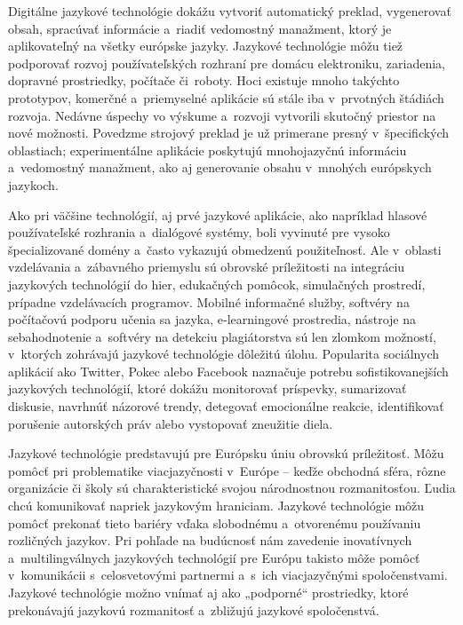 \begin{multicols}{2}
Digitálne jazykové technológie dokážu vytvoriť automatický preklad, vygenerovať obsah, spracúvať informácie a~riadiť vedomostný manažment, ktorý je aplikovateľný na všetky európske jazyky. Jazykové technológie môžu tiež podporovať rozvoj používateľských rozhraní pre domácu elektroniku, zariadenia, dopravné prostriedky, počítače či~roboty. Hoci existuje mnoho takýchto prototypov, komerčné a~priemyselné aplikácie sú stále iba v~prvotných štádiách rozvoja. Nedávne úspechy vo výskume a~rozvoji vytvorili skutočný priestor na nové možnosti. Povedzme strojový preklad je už primerane presný v~špecifických oblastiach; experimentálne aplikácie poskytujú mnohojazyčnú informáciu a~vedomostný manažment, ako aj generovanie obsahu v~mnohých európskych jazykoch.

Ako pri väčšine technológií, aj prvé jazykové aplikácie, ako napríklad hlasové používateľské rozhrania a~dialógové systémy, boli vyvinuté pre vysoko špecializované domény a~často vykazujú obmedzenú použiteľnosť. Ale v~oblasti vzdelávania a~zábavného priemyslu sú obrovské príležitosti na integráciu jazykových technológií do hier, edukačných pomôcok, simulačných prostredí, prípadne vzdelávacích programov. Mobilné informačné služby, softvéry na počítačovú podporu učenia sa jazyka, e‑learningové prostredia, nástroje na sebahodnotenie a~softvéry na detekciu plagiátorstva sú len zlomkom možností, v~ktorých zohrávajú jazykové technológie dôležitú úlohu. Popularita sociálnych aplikácií ako Twitter, Pokec alebo Facebook naznačuje potrebu sofistikovanejších jazykových technológií, ktoré dokážu monitorovať príspevky, sumarizovať diskusie, navrhnúť názorové trendy, detegovať emocionálne reakcie, identifikovať porušenie autorských práv alebo vystopovať zneužitie diela.


Jazykové technológie predstavujú pre Eu\-róp\-sku úniu obrovskú
príležitosť. Môžu pomôcť pri problematike viacjazyčnosti
v~Eu\-ró\-pe – keďže  obchodná sféra, rôzne organizácie či školy
sú charakteristické svojou národnostnou rozmanitosťou. Ľudia chcú
komunikovať napriek jazykovým hraniciam. Jazykové technológie môžu
pomôcť prekonať tieto bariéry vďaka slobodnému a~otvorenému
používaniu rozličných jazykov. Pri pohľade na budúcnosť nám
zavedenie inovatívnych a~multilingválnych jazykových technológií
pre Európu takisto môže pomôcť v~komunikácii s~celosvetovými
partnermi a~s~ich   viacjazyčnými spoločenstvami. Jazykové
technológie možno vnímať aj ako „podporné“ prostriedky, ktoré
prekonávajú jazykovú rozmanitosť a~zbližujú jazykové
spoločenstvá.


\end{multicols}
